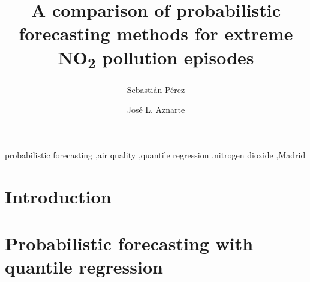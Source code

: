 \documentclass[a4paper,twocolumn,5p]{elsarticle}
\begin{document}
\newcommand{\no}{NO\textsubscript{2}\xspace}

\begin{frontmatter}

\title{A comparison of probabilistic forecasting methods for extreme \no pollution episodes}

\author{Sebasti\'an P\'erez}
\address{Artificial Intelligence Department\\Universidad Nacional de
  Educaci\'on a Distancia --- UNED\\c/ Juan del Rosal, 16, Madrid, Spain}

\author{Jos\'e L. Aznarte}
\address{Artificial Intelligence Department\\Universidad Nacional de
  Educaci\'on a Distancia --- UNED\\c/ Juan del Rosal, 16, Madrid, Spain}



\begin{abstract}

\end{abstract}

\begin{keyword}
probabilistic forecasting \sep air quality \sep quantile regression
\sep nitrogen dioxide \sep Madrid
\end{keyword}

\end{frontmatter}


\section{Introduction}
\label{sec:intro}



\section{Probabilistic forecasting with quantile regression}
\label{sec:probForec}
\end{document}
